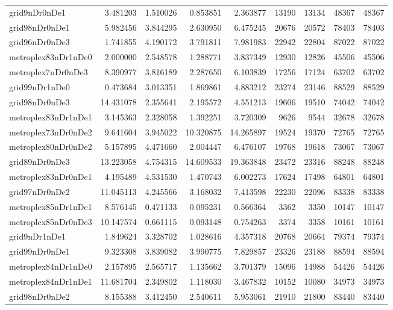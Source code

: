 \begin{longtable}{|l|r|r|r|r|r|r|r|r|}
grid9nDr0nDe1 & 3.481203 & 1.510026 & 0.853851 & 2.363877 & 13190 & 13134 & 48367 & 48367 \\
grid98nDr0nDe1 & 5.982456 & 3.844295 & 2.630950 & 6.475245 & 20676 & 20572 & 78403 & 78403 \\
grid96nDr0nDe3 & 1.741855 & 4.190172 & 3.791811 & 7.981983 & 22942 & 22804 & 87022 & 87022 \\
metroplex83nDr1nDe0 & 2.000000 & 2.548578 & 1.288771 & 3.837349 & 12930 & 12826 & 45506 & 45506 \\
metroplex7nDr0nDe3 & 8.390977 & 3.816189 & 2.287650 & 6.103839 & 17256 & 17124 & 63702 & 63702 \\
grid99nDr1nDe0 & 0.473684 & 3.013351 & 1.869861 & 4.883212 & 23274 & 23146 & 88529 & 88529 \\
grid98nDr0nDe3 & 14.431078 & 2.355641 & 2.195572 & 4.551213 & 19606 & 19510 & 74042 & 74042 \\
metroplex83nDr1nDe1 & 3.145363 & 2.328058 & 1.392251 & 3.720309 & 9626 & 9544 & 32678 & 32678 \\
metroplex73nDr0nDe2 & 9.641604 & 3.945022 & 10.320875 & 14.265897 & 19524 & 19370 & 72765 & 72765 \\
metroplex80nDr0nDe2 & 5.157895 & 4.471660 & 2.004447 & 6.476107 & 19768 & 19618 & 73067 & 73067 \\
grid89nDr0nDe3 & 13.223058 & 4.754315 & 14.609533 & 19.363848 & 23472 & 23316 & 88248 & 88248 \\
metroplex83nDr0nDe1 & 4.195489 & 4.531530 & 1.470743 & 6.002273 & 17624 & 17498 & 64801 & 64801 \\
grid97nDr0nDe2 & 11.045113 & 4.245566 & 3.168032 & 7.413598 & 22230 & 22096 & 83338 & 83338 \\
metroplex85nDr1nDe1 & 8.576145 & 0.471133 & 0.095231 & 0.566364 & 3362 & 3350 & 10147 & 10147 \\
metroplex85nDr0nDe3 & 10.147574 & 0.661115 & 0.093148 & 0.754263 & 3374 & 3358 & 10161 & 10161 \\
grid9nDr1nDe1 & 1.849624 & 3.328702 & 1.028616 & 4.357318 & 20768 & 20664 & 79374 & 79374 \\
grid99nDr0nDe1 & 9.323308 & 3.839082 & 3.990775 & 7.829857 & 23326 & 23188 & 88594 & 88594 \\
metroplex84nDr1nDe0 & 2.157895 & 2.565717 & 1.135662 & 3.701379 & 15096 & 14988 & 54426 & 54426 \\
metroplex84nDr1nDe1 & 11.681704 & 2.349802 & 1.118030 & 3.467832 & 10152 & 10080 & 34973 & 34973 \\
grid98nDr0nDe2 & 8.155388 & 3.412450 & 2.540611 & 5.953061 & 21910 & 21800 & 83440 & 83440 \\

\end{longtable}
